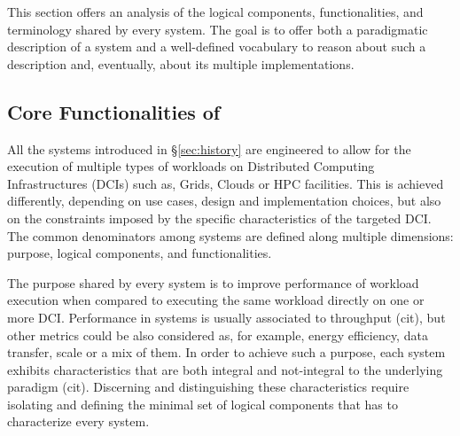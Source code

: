 \documentclass{sig-alternate}
\begin{document}
This section offers an analysis of the logical components,
functionalities, and terminology shared by every \pilotjob system. The
goal is to offer both a paradigmatic description of a \pilotjob system
and a well-defined vocabulary to reason about such a description and,
eventually, about its multiple implementations.





\subsection{Core Functionalities of \pilotjobs}
\label{subsec:vocab_core_functionalities}

All the \pilotjob systems introduced in \S\ref{sec:history} are
engineered to allow for the execution of multiple types of workloads on
Distributed Computing Infrastructures (DCIs) such as, Grids, Clouds or
HPC facilities. This is achieved differently, depending on use cases,
design and implementation choices, but also on the constraints imposed
by the specific characteristics of the targeted DCI. The common
denominators among \pilotjob systems are defined along multiple
dimensions: purpose, logical components, and functionalities.


The purpose shared by every \pilotjob system is to improve performance
of workload execution when compared to executing the same workload
directly on one or more  DCI. Performance in \pilotjob systems is
usually associated to throughput (cit), but other metrics could be also
considered as, for example, energy efficiency, data transfer, scale or a
mix of them. In order to achieve such a purpose, each \pilotjob system
exhibits characteristics that are both integral and not-integral to the
underlying \pilotjob paradigm (cit). Discerning and distinguishing these
characteristics require isolating and defining the minimal set of
logical components that has to characterize every \pilotjob system.
\end{document}
